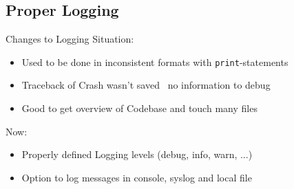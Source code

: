 \subsection{Proper Logging}

\begin{frame}[c]{Changes to Logging}
    \large
    Situation:
    \begin{itemize}[<+(1)->]
        \item Used to be done in inconsistent formats with \texttt{print}-statements
        \item Traceback of Crash wasn't saved \MVRightarrow\ no information to debug
        \item Good to get overview of Codebase and touch many files
    \end{itemize}

    Now:
    \begin{itemize}[<+(1)->]
        \item Properly defined Logging levels (debug, info, warn, ...)
        \item Option to log messages in console, syslog and local file
    \end{itemize}
\end{frame}

